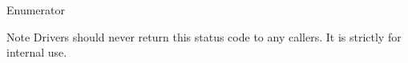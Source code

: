 \begin{DoxyEnumFields}{Enumerator}
\begin{DoxyNote}{Note}
Drivers should never return this status code to any callers. It is strictly for internal use. 
\end{DoxyNote}
\\
\hline

\end{DoxyEnumFields}
